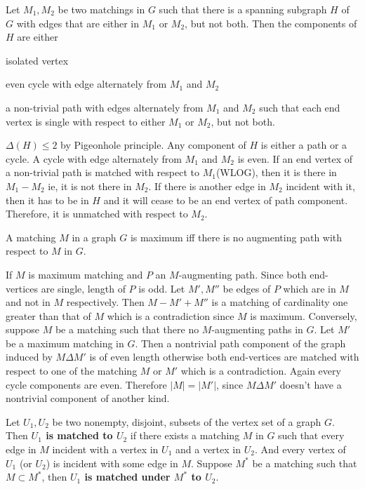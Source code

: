 \begin{theorem}
	Let $M_1,M_2$ be two matchings in $G$ such that there is a spanning subgraph $H$ of $G$ with edges that are either in $M_1$ or $M_2$, but not both. Then the components of $H$ are either \begin{enumerate*} \item isolated vertex \item even cycle with edge alternately from $M_1$ and $M_2$ \item a non-trivial path with edges alternately from $M_1$ and $M_2$ such that each end vertex is single with respect to either $M_1$ or $M_2$, but not both. \end{enumerate*}
\end{theorem}
\begin{synopsis}
	$\Delta(H) \le 2$ by Pigeonhole principle. Any component of $H$ is either a path or a cycle. A cycle with edge alternately from $M_1$ and $M_2$ is even. If an end vertex of a non-trivial path is matched with respect to $M_1$(WLOG), then it is there in $M_1-M_2$ ie, it is not there in $M_2$. If there is another edge in $M_2$ incident with it, then it has to be in $H$ and it will cease to be an end vertex of path component. Therefore, it is unmatched with respect to $M_2$.
\end{synopsis}

\begin{theorem}
	A matching $M$ in a graph $G$ is maximum iff there is no augmenting path with respect to $M$ in $G$.
\end{theorem}
\begin{synopsis}
	If $M$ is maximum matching and $P$ an $M$-augmenting path. Since both end-vertices are single, length of $P$ is odd. Let $M',M''$ be edges of $P$ which are in $M$ and not in $M$ respectively. Then $M - M' + M''$ is a matching of cardinality one greater than that of $M$ which is a contradiction since $M$ is maximum. Conversely, suppose $M$ be a matching such that there no $M$-augmenting paths in $G$. Let $M'$ be a maximum matching in $G$. Then a nontrivial path component of the graph induced by $M \Delta M'$ is of even length otherwise both end-vertices are matched with respect to one of the matching $M$ or $M'$ which is a contradiction. Again every cycle components are even. Therefore $|M| = |M'|$, since $M \Delta M'$ doesn't have a nontrivial component of another kind.
\end{synopsis}

\begin{definition}
	Let $U_1,U_2$ be two nonempty, disjoint, subsets of the vertex set of a graph $G$. Then \textbf{$U_1$ is matched to $U_2$} if there exists a matching $M$ in $G$ such that every edge in $M$ incident with a vertex in $U_1$ and a vertex in $U_2$. And every vertex of $U_1$ (or $U_2$) is incident with some edge in $M$. Suppose $M^*$ be a matching such that $M \subset M^*$, then \textbf{$U_1$ is matched under $M^*$ to $U_2$}.
\end{definition}

